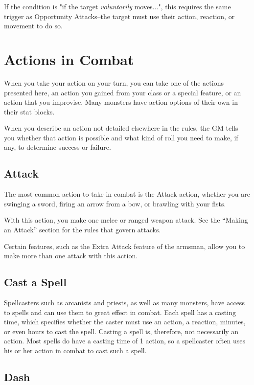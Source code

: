If the condition is "if the target \textit{voluntarily} moves...", this requires the same trigger as Opportunity Attacks--the target must use their action, reaction, or movement to do so.

\section{Actions in Combat}\label{sec:actions-in-combat}

When you take your action on your turn, you can take one of the actions presented here, an action you gained from your class or a special feature, or an action that you improvise. Many monsters have action options of their own in their stat blocks.

When you describe an action not detailed elsewhere in the rules, the GM tells you whether that action is possible and what kind of roll you need to make, if any, to determine success or failure.

\subsection{Attack}

The most common action to take in combat is the Attack action, whether you are swinging a sword, firing an arrow from a bow, or brawling with your fists.

With this action, you make one melee or ranged weapon attack. See the “Making an Attack” section for the rules that govern attacks.

Certain features, such as the Extra Attack feature of the armsman, allow you to make more than one attack with this action.

\subsection{Cast a Spell}

Spellcasters such as arcanists and priests, as well as many monsters, have access to spells and can use them to great effect in combat. Each spell has a casting time, which specifies whether the caster must use an action, a reaction, minutes, or even hours to cast the spell. Casting a spell is, therefore, not necessarily an action. Most spells do have a casting time of 1 action, so a spellcaster often uses his or her action in combat to cast such a spell.

\subsection{Dash}

